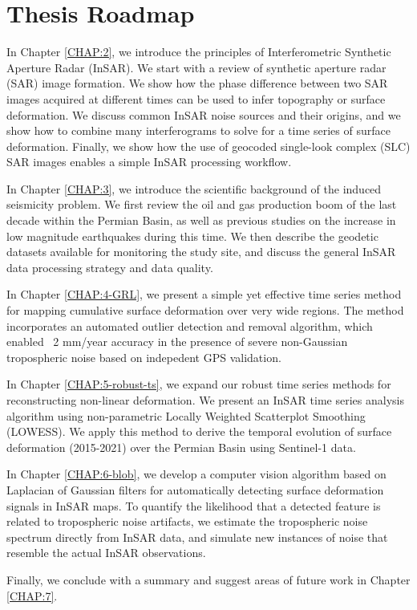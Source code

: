 \section{Thesis Roadmap}
\label{sec:chap1-roadmap}


In Chapter \ref{CHAP:2}, we introduce the principles of Interferometric Synthetic Aperture Radar (InSAR). We start with a review of synthetic aperture radar (SAR) image formation. We show how the phase difference between two SAR images acquired at different times can be used to infer topography or surface deformation. We discuss common InSAR noise sources and their origins, and we show how to combine many interferograms to solve for a time series of surface deformation. Finally, we show how the use of geocoded single-look complex (SLC) SAR images enables a simple InSAR processing workflow. 


In Chapter \ref{CHAP:3}, we introduce the scientific background of the induced seismicity problem. We first review the oil and gas production boom of the last decade within the Permian Basin, as well as previous studies on the increase in low magnitude earthquakes during this time. We then describe the geodetic datasets available for monitoring the study site, and discuss the general InSAR data processing strategy and data quality.


In Chapter \ref{CHAP:4-GRL}, we present a simple yet effective time series method for mapping cumulative surface deformation over very wide regions. The method incorporates an automated outlier detection and removal algorithm, which enabled ~2 mm/year accuracy in the presence of severe non-Gaussian tropospheric noise based on indepedent GPS validation.


In Chapter \ref{CHAP:5-robust-ts}, we expand our robust time series methods for reconstructing non-linear deformation. We present an InSAR time series analysis algorithm using non-parametric Locally Weighted Scatterplot Smoothing (LOWESS). We apply this method to derive the temporal evolution of surface deformation (2015-2021) over the Permian Basin using Sentinel-1 data.


In Chapter \ref{CHAP:6-blob}, we develop a computer vision algorithm based on Laplacian of Gaussian filters for automatically detecting surface deformation signals in InSAR maps. To quantify the likelihood that a detected feature is related to tropospheric noise artifacts, we estimate the tropospheric noise spectrum directly from InSAR data, and simulate new instances of noise that resemble the actual InSAR observations. 


Finally, we conclude with a summary and suggest areas of future work in Chapter \ref{CHAP:7}.
